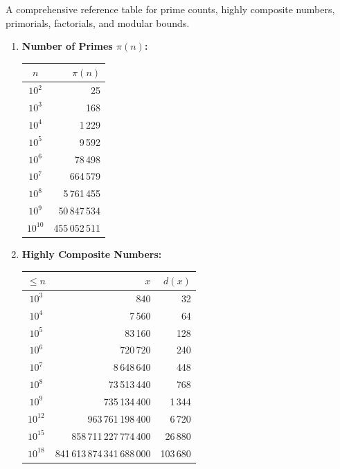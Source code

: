 
A comprehensive reference table for prime counts, highly composite numbers, primorials, factorials, and modular bounds.

\begin{enumerate}
    \item \textbf{Number of Primes $\pi(n)$:}
    \begin{tabular}{|c|r|}
        \hline
        $n$ & $\pi(n)$ \\ \hline
        $10^2$ & 25 \\ \hline
        $10^3$ & 168 \\ \hline
        $10^4$ & 1\,229 \\ \hline
        $10^5$ & 9\,592 \\ \hline
        $10^6$ & 78\,498 \\ \hline
        $10^7$ & 664\,579 \\ \hline
        $10^8$ & 5\,761\,455 \\ \hline
        $10^9$ & 50\,847\,534 \\ \hline
        $10^{10}$ & 455\,052\,511 \\ \hline
    \end{tabular}

    \item \textbf{Highly Composite Numbers:}
    \begin{tabular}{|c|r|r|}
        \hline
        $\le n$ & $x$ & $d(x)$ \\ \hline
        $10^3$ & 840 & 32 \\ \hline
        $10^4$ & 7\,560 & 64 \\ \hline
        $10^5$ & 83\,160 & 128 \\ \hline
        $10^6$ & 720\,720 & 240 \\ \hline
        $10^7$ & 8\,648\,640 & 448 \\ \hline
        $10^8$ & 73\,513\,440 & 768 \\ \hline
        $10^9$ & 735\,134\,400 & 1\,344 \\ \hline
        $10^{12}$ & 963\,761\,198\,400 & 6\,720 \\ \hline
        $10^{15}$ & 858\,711\,227\,774\,400 & 26\,880 \\ \hline
        $10^{18}$ & 841\,613\,874\,341\,688\,000 & 103\,680 \\ \hline
    \end{tabular}


\end{enumerate}
